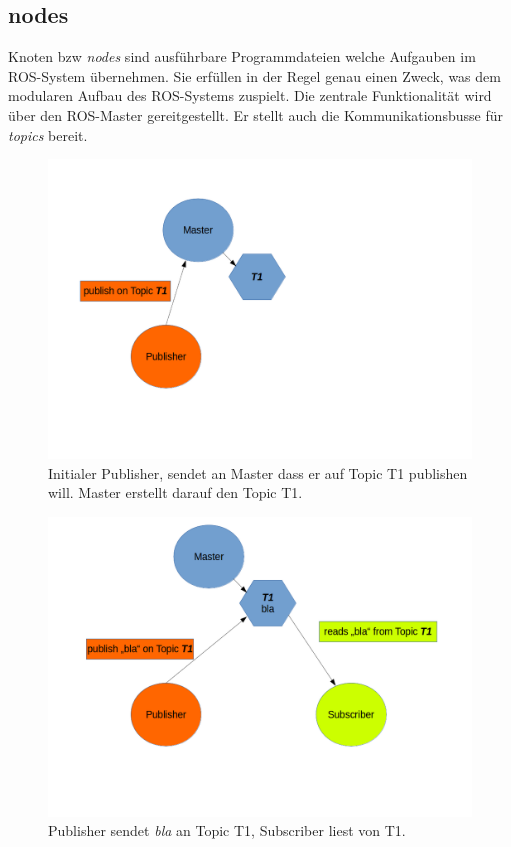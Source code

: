 		\subsection{nodes}
		Knoten bzw \textit{nodes} sind ausführbare Programmdateien welche Aufgauben im ROS-System übernehmen. Sie erfüllen in der Regel genau einen Zweck, was dem modularen Aufbau des ROS-Systems zuspielt. Die zentrale Funktionalität wird über den ROS-Master gereitgestellt. Er stellt auch die Kommunikationsbusse für \textit{topics} bereit.
		\begin{figure}[H]
		\centering
		\includegraphics[width=0.7\linewidth]{../media/pub_sub-1}
		\caption{Initialer Publisher, sendet an Master dass er auf Topic T1 publishen will. Master erstellt darauf den Topic T1.}
		\label{fig:pub_sub-1}
		\end{figure}
		\begin{figure}[H]
		\centering
		\includegraphics[width=0.7\linewidth]{../media/pub_sub-2}
		\caption{Publisher sendet \textit{bla} an Topic T1, Subscriber liest von T1.}
		\label{fig:pub_sub-2}
		\end{figure}
		
